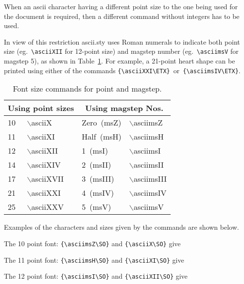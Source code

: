 When an {\sc ascii} character having a different point size to the one
being used for the document is required, then a different command without
integers has to be used.


In view of this restriction {\sc ascii.sty} uses Roman numerals to indicate
both point size (eg.\ \verb!\asciiXII! for 12-point size) and
magstep number (eg.\ \verb!\asciimsV! for magstep 5), as shown
in Table~\ref{fontsizes}.
For example,  a 21-point  heart shape {\asciiXXI \ETX} can be  printed
using either of the
commands \verb#{\asciiXXI\ETX}#\ or\ \verb#{\asciimsIV\ETX}#.

\begin{table}[h,t]
\begin{center}
\begin{tabular}{|l|l|l|l|}
\hline
\multicolumn{2}{|c|}{Using point sizes}&
\multicolumn{2}{|c|}{Using magstep Nos.}\\
\hline
10 & {$\backslash$}asciiX   & Zero\ (msZ) & {$\backslash$}asciimsZ \\
11 & {$\backslash$}asciiXI   & Half\ (msH) & {$\backslash$}asciimsH \\
12 & {$\backslash$}asciiXII   & 1\ (msI) & {$\backslash$}asciimsI \\
14 & {$\backslash$}asciiXIV   & 2\ (msII) & {$\backslash$}asciimsII \\
17 & {$\backslash$}asciiXVII   & 3\ (msIII) & {$\backslash$}asciimsIII \\
21 & {$\backslash$}asciiXXI   & 4\ (msIV) & {$\backslash$}asciimsIV \\
25 & {$\backslash$}asciiXXV   & 5\ (msV) & {$\backslash$}asciimsV \\
\hline
\end{tabular}
\end{center}
\caption{Font size commands for point and magstep.}
\label{fontsizes}
\end{table}



Examples of the characters and sizes given by the commands are shown below.

\medskip
\hspace*{1cm} The 10 point font: \verb#{\asciimsZ\SO}# and \verb#{\asciiX\SO}#  give {\asciimsZ \SO}

\hspace*{1cm} The 11 point font: \verb#{\asciimsH\SO}# and \verb#{\asciiXI\SO}#  give {\asciimsH \SO}

\hspace*{1cm} The 12 point font: \verb#{\asciimsI\SO}# and \verb#{\asciiXII\SO}#  give {\asciimsI \SO}

